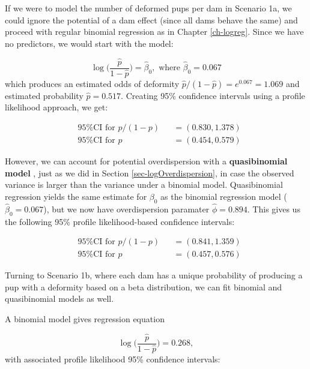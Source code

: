 \documentclass[
]{krantz}
\begin{document}
If we were to model the number of deformed pups per dam in Scenario 1a, we could ignore the potential of a dam effect (since all dams behave the same) and proceed with regular binomial regression as in Chapter \ref{ch-logreg}. Since we have no predictors, we would start with the model:

\begin{equation*}
  \log \bigg( \frac{\hat{p}}{1-\hat{p}} \bigg) = \hat{\beta}_0, \textrm{ where } \hat{\beta}_0 = 0.067
\end{equation*}
which produces an estimated odds of deformity \(\widehat{p}/(1-\widehat{p}) = e^{0.067} = 1.069\) and estimated probability \(\widehat{p} = 0.517\). Creating 95\% confidence intervals using a profile likelihood approach, we get:



\[
\begin{alignedat}{2}
  &\textrm{95\% CI for } p/(1-p) &&= (0.830, 1.378) \\
  &\textrm{95\% CI for } p       &&= (0.454, 0.579)
\end{alignedat}
\]

However, we can account for potential overdispersion  with a \textbf{quasibinomial model} , just as we did in Section \ref{sec-logOverdispersion}, in case the observed variance is larger than the variance under a binomial model. Quasibinomial regression yields the same estimate for \(\beta_0\) as the binomial regression model (\(\hat{\beta}_0 = 0.067\)), but we now have overdispersion paramater \(\widehat{\phi} = 0.894\). This gives us the following 95\% profile likelihood-based confidence intervals:

\[
\begin{alignedat}{2}
  &\textrm{95\% CI for } p/(1-p) &&= (0.841, 1.359) \\
  &\textrm{95\% CI for } p       &&= (0.457, 0.576)
\end{alignedat}
\]

Turning to Scenario 1b, where each dam has a unique probability of producing a pup with a deformity based on a beta distribution, we can fit binomial and quasibinomial models as well.

A binomial model gives regression equation

\begin{equation*}
  \log\bigg(\frac{\hat{p}}{1-\hat{p}}\bigg) = 0.268,
\end{equation*}
with associated profile likelihood 95\% confidence intervals:
\end{document}
